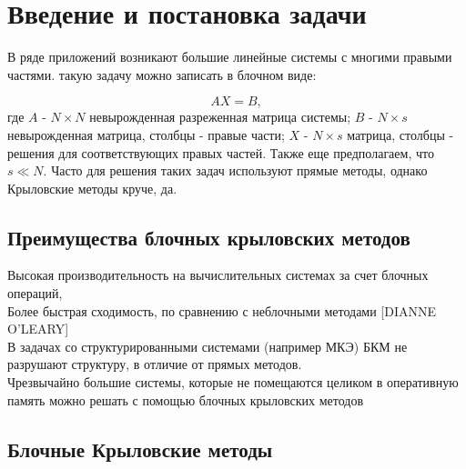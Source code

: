 \section{Введение и постановка задачи}
\label{sec:Chapter0} 
В ряде приложений возникают большие линейные системы с многими правыми частями. такую задачу можно записать в блочном виде:\\
\begin{figure}
    \centering
    \label{fig:system}
\end{figure}

$$AX=B,$$
где $A$ - $N\times N$ невырожденная разреженная матрица системы;
$B$ - $N\times s$ невырожденная матрица, столбцы - правые части; 
$X$ - $N\times s$ матрица, столбцы - решения для соответствующих правых частей. 
Также еще предполагаем, что $s\ll N$.
Часто для решения таких задач используют прямые методы, однако Крыловские методы круче, да.
\subsection{Преимущества блочных крыловских методов}
Высокая производительность на вычислительных системах за счет блочных операций,\\
Более быстрая сходимость, по сравнению с неблочными методами [DIANNE O'LEARY] \\
В задачах со структурированными системами (например МКЭ) БКМ не разрушают структуру,
в отличие от прямых методов.\\
Чрезвычайно большие системы, которые не помещаются целиком в оперативную память 
можно решать с помощью блочных крыловских методов\\

\subsection{Блочные Крыловские методы}


\newpage
